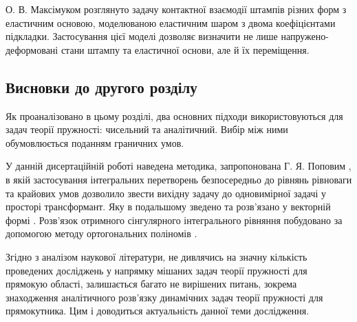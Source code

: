 О. В. Максімуком \cite{maksymuk_1} розглянуто задачу контактної взаємодії штампів різних форм з еластичним основою,
моделюваною еластичним шаром з двома коефіцієнтами підкладки.
Застосування цієї моделі дозволяє визначити не лише напружено-деформовані стани штампу та еластичної основи, але й їх переміщення.

\subsection{Висновки до другого розділу}

Як проаналізовано в цьому розділі, два основних підходи використовуються для задач теорії пружності: чисельний та аналітичний.
Вибір між ними обумовлюється поданням граничних умов.

У данній дисертаційній роботі наведена методика, запропонована Г. Я. Поповим \cite{popov_4},
в якій застосування інтегральних перетворень безпосередньо до рівнянь рівноваги та крайових умов
дозволило звести вихідну задачу до одновимірної задачі у просторі трансформант.
Яку в подальшому зведено та розв'язано у векторній формі \cite{popov_5}.
Розв'язок отримного сінгулярного інтегрального рівняння побудовано за допомогою методу ортогональних поліномів \cite{popov_3}.

Згідно з аналізом наукової літератури,
не дивлячись на значну кількість проведених досліджень у напрямку мішаних задач теорії пружності для прямокую області,
залишається багато не вирішених питань, зокрема знаходження аналітичного розв'язку динамічних задач теорії пружності для прямокутника.
Цим і доводиться актуальність данної теми дослідження.